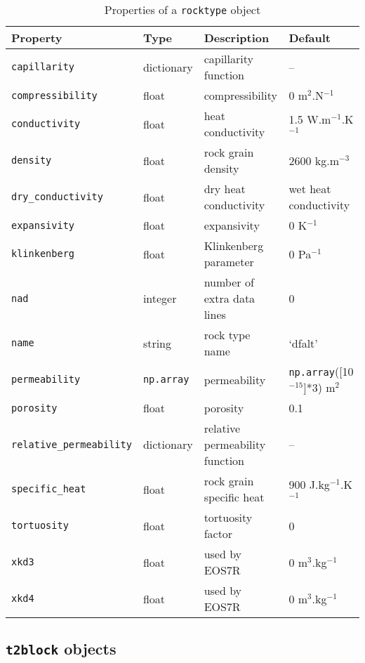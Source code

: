 \begin{table}
  \begin{center}
    \begin{tabular}{|l|l|p{30mm}|l|}
      \hline
      \textbf{Property} & \textbf{Type} & \textbf{Description} & \textbf{Default}\\
      \hline
      \texttt{capillarity} & dictionary & capillarity function & --\\
      \texttt{compressibility} & float & compressibility & 0 m$^2$.N$^{-1}$\\
      \texttt{conductivity} & float & heat conductivity & 1.5 W.m$^{-1}$.K$^{-1}$\\
      \texttt{density} & float & rock grain density & 2600 kg.m$^{-3}$\\
      \texttt{dry\_conductivity} & float & dry heat conductivity & wet heat conductivity\\
      \texttt{expansivity} & float & expansivity & 0 K$^{-1}$\\
      \texttt{klinkenberg} & float & Klinkenberg parameter & 0 Pa$^{-1}$\\
      \texttt{nad} & integer & number of extra data lines & 0\\
      \texttt{name} & string & rock type name & `dfalt'\\
      \texttt{permeability} & \texttt{np.array} & permeability & \texttt{np.array}([10$^{-15}$]*3) m$^2$\\
      \texttt{porosity} & float & porosity & 0.1\\
      \texttt{relative\_permeability} & dictionary & relative permeability function & --\\
      \texttt{specific\_heat} & float & rock grain specific heat & 900 J.kg$^{-1}$.K$^{-1}$\\
      \texttt{tortuosity} & float & tortuosity factor & 0\\
      \texttt{xkd3} & float & used by EOS7R & 0 m$^{3}$.kg$^{-1}$\\
      \texttt{xkd4} & float & used by EOS7R & 0 m$^{3}$.kg$^{-1}$\\
      \hline
    \end{tabular}
    \caption{Properties of a \texttt{rocktype} object}
    \label{tb:rocktype_properties}
  \end{center}
\end{table}

\subsection{\texttt{t2block} objects}

